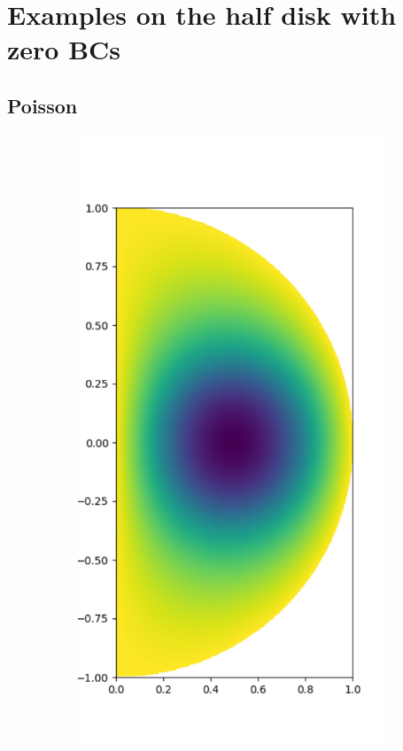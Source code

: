 \documentclass[11pt, oneside]{article}   	%
\begin{document}
%
\section{Examples on the half disk with zero BCs}\label{Section:Examples}


\subsection{Poisson}

\begin{figure}
	\begin{subfigure}[t]{0.3\textwidth}
	\centering
	\includegraphics[scale=0.3]{solution-poisson}

\end{subfigure}
\end{figure}
\end{document}
